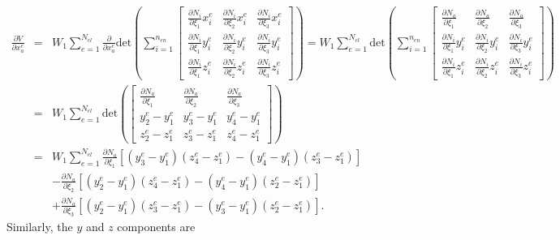 \begin{eqnarray}
\frac{\partial V}{\partial x_a^e} &=& W_1\sum_{e=1}^{N_{el}} \frac{\partial}{\partial x_a^e}\text{det}\left(\sum_{i=1}^{n_{en}}
\begin{bmatrix}
\frac{\partial N_i}{\partial \xi_1} x_i^e & \frac{\partial N_i}{\partial \xi_2} x_i^e & \frac{\partial N_i}{\partial \xi_3} x_i^e \\
%
\frac{\partial N_i}{\partial \xi_1}y_i^e & \frac{\partial N_i}{\partial \xi_2}y_i^e & \frac{\partial N_i}{\partial \xi_3}y_i^e \\
%
\frac{\partial N_i}{\partial \xi_1}z_i^e & \frac{\partial N_i}{\partial \xi_2}z_i^e & \frac{\partial N_i}{\partial \xi_3}z_i^e 
\end{bmatrix}\right) = W_1\sum_{e=1}^{N_{el}} \text{det}\left(\sum_{i=1}^{n_{en}}
%
\begin{bmatrix}
\frac{\partial N_a}{\partial \xi_1}  & \frac{\partial N_a}{\partial \xi_2} & \frac{\partial N_a}{\partial \xi_3} \\
%
\frac{\partial N_i}{\partial \xi_1}y_i^e  & \frac{\partial N_i}{\partial \xi_2}y_i^e & \frac{\partial N_i}{\partial \xi_3}y_i^e \\
%
\frac{\partial N_i}{\partial \xi_1}z_i^e  & \frac{\partial N_i}{\partial \xi_2}z_i^e & \frac{\partial N_i}{\partial \xi_3}z_i^e 
\end{bmatrix}\right) \nonumber\\
&=& W_1\sum_{e=1}^{N_{el}} \text{det}\left(
%
\begin{bmatrix}
\frac{\partial N_a}{\partial \xi_1}  & \frac{\partial N_a}{\partial \xi_2} & \frac{\partial N_a}{\partial \xi_3} \\
%
y_2^e - y_1^e & y_3^e - y_1^e & y_4^e - y_1^e \\
%
z_2^e - z_1^e & z_3^e - z_1^e & z_4^e - z_1^e 
\end{bmatrix}\right)\nonumber\\
&=& W_1\sum_{e=1}^{N_{el}}\frac{\partial N_a}{\partial \xi_1}[(y_3^e - y_1^e)(z_4^e - z_1^e)-(y_4^e - y_1^e)(z_3^e - z_1^e)] \nonumber\\
%
&&-\frac{\partial N_a}{\partial \xi_2}\left[(y_2^e - y_1^e)(z_4^e - z_1^e)-(y_4^e - y_1^e)(z_2^e - z_1^e)\right] \nonumber\\
%
&&+\frac{\partial N_a}{\partial \xi_3}\left[(y_2^e - y_1^e)(z_3^e - z_1^e)-(y_3^e - y_1^e)(z_2^e - z_1^e)\right].
\label{eq:dVdx}
\end{eqnarray}
%
Similarly, the $y$ and $z$ components are
%
